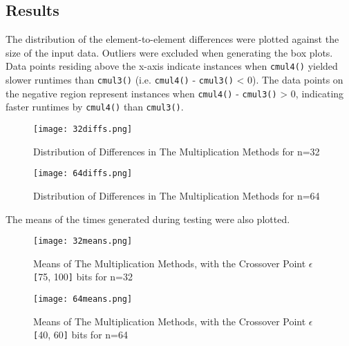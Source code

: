 \documentclass[usletter, 12pt]{article}
\begin{document}
        \clearpage
        \newpage
        \subsection{Results}
        The distribution of the element-to-element differences were plotted against the size of the input data. Outliers were excluded when generating the box plots. Data points residing above the x-axis indicate instances when \texttt{cmul4()} yielded slower runtimes than \texttt{cmul3()} (i.e. \texttt{cmul4()} - \texttt{cmul3()} < 0). The data points on the negative region represent instances when \texttt{cmul4()} - \texttt{cmul3()} > 0, indicating faster runtimes by \texttt{cmul4()} than \texttt{cmul3()}.

        \begin{figure}[ht]
            \begin{center}
                \texttt{[image: 32diffs.png]}
                \caption{Distribution of Differences in The Multiplication Methods for n=32} \label{32diffs}
            \end{center}
        \end{figure}

        \begin{figure}[ht]
            \begin{center}
                \texttt{[image: 64diffs.png]}
                \caption{Distribution of Differences in The Multiplication Methods for n=64} \label{64diffs}
            \end{center}
        \end{figure}
        \clearpage
        \newpage

        The means of the times generated during testing were also plotted.
        \begin{figure}[ht]
            \begin{center}
                \texttt{[image: 32means.png]}
                \caption{Means of The Multiplication Methods, with the Crossover Point $\epsilon$\texttt{[}75, 100\texttt{]} bits for n=32} \label{32diffs}
            \end{center}
        \end{figure}

        \begin{figure}[ht]
            \begin{center}
                \texttt{[image: 64means.png]}
                \caption{Means of The Multiplication Methods, with the Crossover Point $\epsilon$\texttt{[}40, 60\texttt{]} bits for n=64} \label{64diffs}
            \end{center}
        \end{figure}
\end{document}
